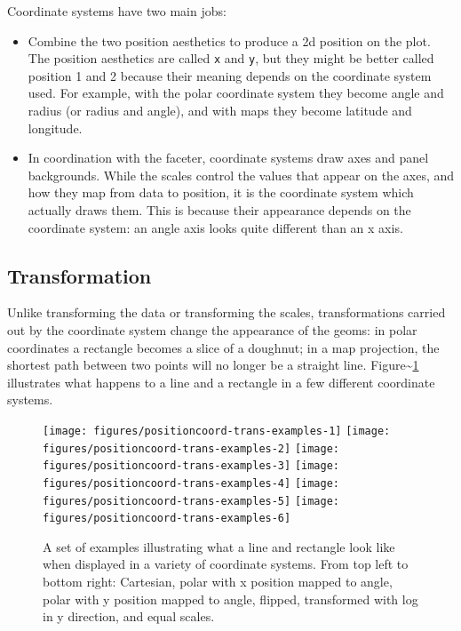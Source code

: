 Coordinate systems have two main jobs:

\begin{itemize}
\itemsep1pt\parskip0pt
\item
  Combine the two position aesthetics to produce a 2d position on the
  plot. The position aesthetics are called \texttt{x} and \texttt{y},
  but they might be better called position 1 and 2 because their meaning
  depends on the coordinate system used. For example, with the polar
  coordinate system they become angle and radius (or radius and angle),
  and with maps they become latitude and longitude.
\item
  In coordination with the faceter, coordinate systems draw axes and
  panel backgrounds. While the scales control the values that appear on
  the axes, and how they map from data to position, it is the coordinate
  system which actually draws them. This is because their appearance
  depends on the coordinate system: an angle axis looks quite different
  than an x axis.
\end{itemize}



\subsection{Transformation}\label{sub:coord-transformation}

Unlike transforming the data or transforming the scales, transformations
carried out by the coordinate system change the appearance of the geoms:
in polar coordinates a rectangle becomes a slice of a doughnut; in a map
projection, the shortest path between two points will no longer be a
straight line. Figure\textasciitilde{}\ref{fig:coord-trans-examples}
illustrates what happens to a line and a rectangle in a few different
coordinate systems. 

\begin{figure}
\texttt{[image: figures/positioncoord-trans-examples-1]} \texttt{[image: figures/positioncoord-trans-examples-2]} \texttt{[image: figures/positioncoord-trans-examples-3]} \texttt{[image: figures/positioncoord-trans-examples-4]} \texttt{[image: figures/positioncoord-trans-examples-5]} \texttt{[image: figures/positioncoord-trans-examples-6]} \caption{A set of examples illustrating what a line and rectangle look like when displayed in a variety of coordinate systems.  From top left to bottom right: Cartesian, polar with x position mapped to angle, polar with y position mapped to angle, flipped, transformed with log in y direction, and equal scales.\label{fig:coord-trans-examples}}
\end{figure}

